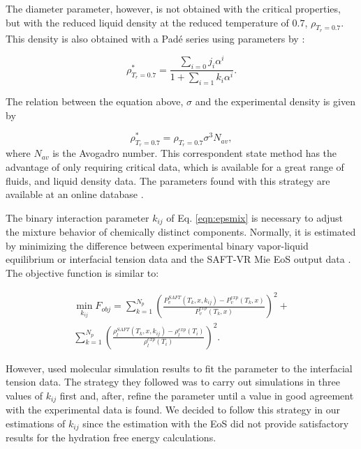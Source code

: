     The diameter parameter, however, is not obtained with the critical properties, but with the reduced liquid density at the reduced temperature of $0.7$, $\rho_{T_{r}=0.7}$. This density is also obtained with a Padé series using parameters by :
    
    \begin{equation}
    \rho_{T_{r}=0.7}^{*} = \frac{\sum_{i=0} j_{i}\alpha^{i}}{1+\sum_{i=1} k_{i}\alpha^{i}} .
    \label{eqn:denscorre}
    \end{equation}
    
    The relation between the equation above, $\sigma$ and the experimental density is given by
    
    \begin{equation}
    \rho_{T_{r}=0.7}^{*} = \rho_{T_{r}=0.7}\sigma^{3}N_{av},   
    \label{eqn:sigmacorre}
    \end{equation}
    where $N_{av}$ is the Avogadro number. This correspondent state method has the advantage of only requiring critical data, which is available for a great range of fluids, and liquid density data. The parameters found with this strategy are available at an online database \cite{ervik2016}.     
    
    The binary interaction parameter $k_{ij}$ of Eq. \eqref{eqn:epsmix} is necessary to adjust the mixture behavior of chemically distinct components. Normally, it is estimated by minimizing the difference between experimental binary vapor-liquid equilibrium or interfacial tension data and the SAFT-VR Mie EoS output data \cite{muller2017,lobanova2016}. The objective function is similar to: 
    
    \begin{equation}
    \begin{aligned}
    \min\limits_{k_{ij}} F_{obj}= \sum_{k=1}^{N_{p}} \left(\frac{P_{v}^{SAFT}(T_{k},x,k_{ij})-P_{v}^{exp}(T_{k},x)}{P_{v}^{exp}(T_{k},x)} \right)^2 +\\
    \sum_{k=1}^{N_{p}} \left(\frac{\rho_{l}^{SAFT}(T_{k},x,k_{ij})-\rho_{l}^{exp}(T_{i})}{\rho_{l}^{exp}(T_{i})} \right)^2 .
    \end{aligned}
    \label{eqn:fobjmix}
    \end{equation}
    
    However,  used molecular simulation results to fit the parameter to the interfacial tension data. The strategy they followed was to carry out simulations in three values of $k_{ij}$ first and, after, refine the parameter until a value in good agreement with the experimental data is found. We decided to follow this strategy in our estimations of $k_{ij}$ since the estimation with the EoS did not provide satisfactory results for the hydration free energy calculations.  

